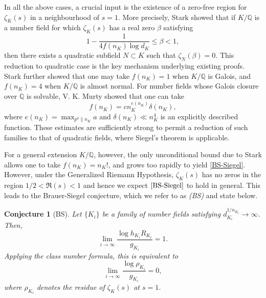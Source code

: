 \documentclass[12pt]{amsart}
\newtheorem{conjecture}[theorem]{Conjecture}
\theoremstyle{definition}
\newcommand{\Q}{\mathbb{Q}}
\begin{document}
In all the above cases, a crucial input is the existence of a zero-free region for $\zeta_K(s)$ in a neighbourhood of $s=1$. More precisely, Stark \cite{Stk} showed that if $K/\Q$ is a number field for which $\zeta_K(s)$ has a real zero $\beta$ satisfying
\begin{equation*}
    1 - \frac{1}{4 f(n_K) \log d_K} \leq \beta < 1,
\end{equation*}
then there exists a quadratic subfield $N\subset K$ such that $\zeta_N(\beta)=0$. This reduction to quadratic case is the key mechanism underlying existing proofs. Stark further showed that one may take $f(n_K)=1$ when $K/\Q$ is Galois, and $f(n_K)=4$ when $K/\Q$ is almost normal. For number fields whose Galois closure over $\Q$ is solvable,  V. K. Murty \cite{Km} showed that one can take 
\begin{equation*}
    f(n_K) = c n_K^{e(n_K)} \delta(n_K),
\end{equation*} 
where $e(n_K) = \max_{p^a \| n_K} a$ and $\delta(n_K) \ll n_K^4$ is an explicitly described function. These estimates are sufficiently strong to permit a reduction of such families to that of quadratic fields, where Siegel's theorem is applicable.
\medskip

For a general extension $K/\Q$, however, the only unconditional bound due to Stark \cite{Stk} allows one to take $f(n_K)= n_K!$, and grows too rapidly to yield \eqref{BS-Siegel}. However, under the Generalized Riemann Hypothesis,  $\zeta_K(s)$ has no zeros in the region $1/2<\Re(s)<1$ and hence we expect $\eqref{BS-Siegel}$ to hold in general. This leads to the Brauer-Siegel conjecture, which we refer to as \textit{(BS)} and state below.




\begin{conjecture}[BS]\label{BS-conj}
    Let $\{K_i\}$ be a family of number fields satisfying $d_{K_i}^{1/n_{K_i}} \to \infty$. Then,
        \begin{equation*}
            \lim_{i\to\infty} \frac{\log h_{K_i}R_{K_i}}{g_{K_i}} = 1.
        \end{equation*}
        Applying the class number formula, this is equivalent to 
        \begin{equation*}
            \lim_{i\to\infty} \frac{\log \rho_{K_i}}{ g_{K_i}} = 0,
        \end{equation*}
        where $\rho_{K_i}$ denotes the residue of $\zeta_K(s)$ at $s=1$.
\end{conjecture}
\end{document}
